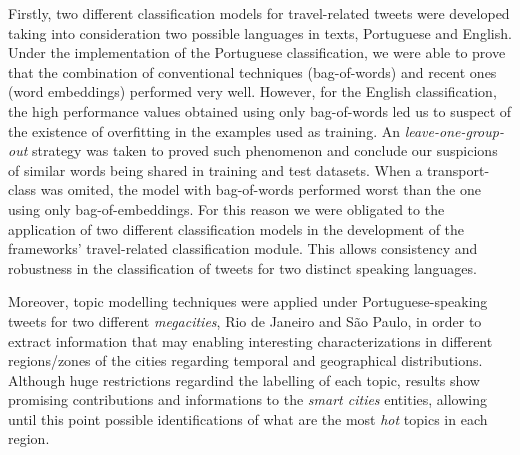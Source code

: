 Firstly, two different classification models for travel-related tweets were developed taking into consideration two possible languages in texts, Portuguese and English. Under the implementation of the Portuguese classification, we were able to prove that the combination of conventional techniques (bag-of-words) and recent ones (word embeddings) performed very well. However, for the English classification, the high performance values obtained using only bag-of-words led us to suspect of the existence of overfitting in the examples used as training. An \textit{leave-one-group-out} strategy was taken to proved such phenomenon and conclude our suspicions of similar words being shared in training and test datasets. When a transport-class was omited, the model with bag-of-words performed worst than the one using only bag-of-embeddings. For this reason we were obligated to the application of two different classification models in the development of the frameworks' travel-related classification module. This allows consistency and robustness in the classification of tweets for two distinct speaking languages.

Moreover, topic modelling techniques were applied under Portuguese-speaking tweets for two different \textit{megacities}, Rio de Janeiro and São Paulo, in order to extract information that may enabling interesting characterizations in different regions/zones of the cities regarding temporal and geographical distributions. Although huge restrictions regardind the labelling of each topic, results show promising contributions and informations to the \textit{smart cities} entities, allowing until this point possible identifications of what are the most \textit{hot} topics in each region.